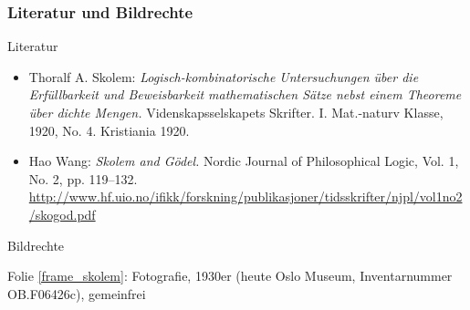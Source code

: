 \documentclass[aspectratio=1610,onlymath]{beamer}
\begin{document}
\begin{frame}[t]\frametitle{Literatur und Bildrechte}

\alert{Literatur}\bigskip

\begin{itemize}
\item Thoralf A. Skolem: \emph{Logisch-kombinatorische Untersuchungen über die Erfüllbarkeit und Beweisbarkeit mathematischen Sätze nebst einem Theoreme über dichte Mengen.} Videnskapsselskapets Skrifter. I. Mat.-naturv Klasse, 1920, No. 4. Kristiania 1920.
\item Hao Wang: \emph{Skolem and Gödel.} Nordic Journal of Philosophical Logic, Vol. 1, No. 2, pp. 119–132. \url{http://www.hf.uio.no/ifikk/forskning/publikasjoner/tidsskrifter/njpl/vol1no2/skogod.pdf}
\end{itemize}

\bigskip

\alert{Bildrechte}\bigskip

Folie \ref{frame_skolem}: Fotografie, 1930er (heute Oslo Museum, Inventarnummer OB.F06426c), gemeinfrei

\end{frame}
\end{document}
